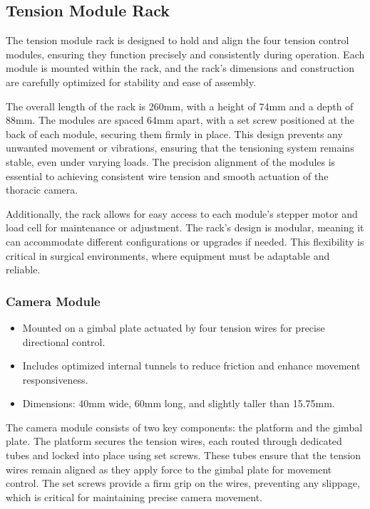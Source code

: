 

\subsection{Tension Module Rack}
The tension module rack is designed to hold and align the four tension control modules, ensuring they function precisely and consistently during operation. Each module is mounted within the rack, and the rack's dimensions and construction are carefully optimized for stability and ease of assembly. 

The overall length of the rack is 260mm, with a height of 74mm and a depth of 88mm. The modules are spaced 64mm apart, with a set screw positioned at the back of each module, securing them firmly in place. This design prevents any unwanted movement or vibrations, ensuring that the tensioning system remains stable, even under varying loads. The precision alignment of the modules is essential to achieving consistent wire tension and smooth actuation of the thoracic camera. 

Additionally, the rack allows for easy access to each module's stepper motor and load cell for maintenance or adjustment. The rack's design is modular, meaning it can accommodate different configurations or upgrades if needed. This flexibility is critical in surgical environments, where equipment must be adaptable and reliable. 



\subsubsection{Camera Module}
\begin{itemize}
    \item Mounted on a gimbal plate actuated by four tension wires for precise directional control.
    \item Includes optimized internal tunnels to reduce friction and enhance movement responsiveness.
    \item Dimensions: 40mm wide, 60mm long, and slightly taller than 15.75mm.
\end{itemize}

The camera module consists of two key components: the platform and the gimbal plate. The platform secures the tension wires, each routed through dedicated tubes and locked into place using set screws. These tubes ensure that the tension wires remain aligned as they apply force to the gimbal plate for movement control. The set screws provide a firm grip on the wires, preventing any slippage, which is critical for maintaining precise camera movement. 

